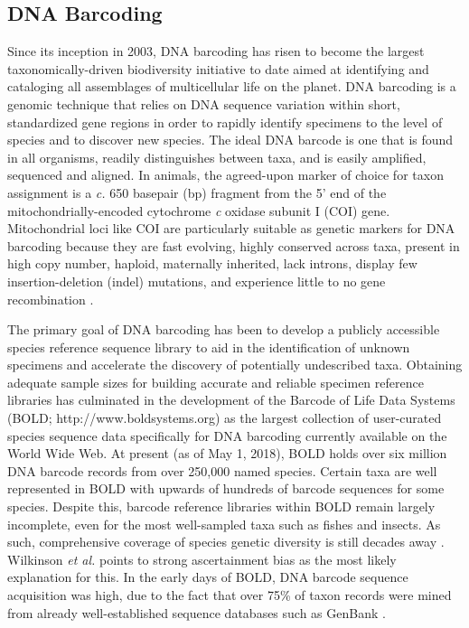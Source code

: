 \subsection{DNA Barcoding}

Since its inception in 2003, DNA barcoding \cite{hebert2003biological} has risen to become the largest \\ taxonomically-driven biodiversity initiative to date aimed at identifying and cataloging all assemblages of multicellular life on the planet. DNA barcoding is a genomic technique that relies on DNA sequence variation within short, standardized gene regions in order to rapidly identify specimens to the level of species and to discover new species. The ideal DNA barcode is one that is found in all organisms, readily distinguishes between taxa, and is easily amplified, sequenced and aligned. In animals, the agreed-upon marker of choice for taxon assignment is a \textit{c.} 650 basepair (bp) fragment from the 5' end of the mitochondrially-encoded cytochrome \textit{c} oxidase subunit I (COI) gene. Mitochondrial loci like COI are particularly suitable as genetic markers for DNA barcoding because they are fast evolving, highly conserved across taxa, present in high copy number, haploid, maternally inherited, lack introns, display few insertion-deletion (indel) mutations, and experience little to no gene recombination \cite{hebert2003biological, hebert2003barcoding}.



The primary goal of DNA barcoding has been to develop a publicly accessible species reference sequence library to aid in the identification of unknown specimens and accelerate the discovery of potentially undescribed taxa. Obtaining adequate sample sizes for building accurate and reliable specimen reference libraries has culminated in the development of the Barcode of Life Data Systems (BOLD; http://www.boldsystems.org) \cite{ratnasingham2007bold} as the largest collection of user-curated species sequence data specifically for DNA barcoding currently available on the World Wide Web. At present (as of May 1, 2018), BOLD holds over six million DNA barcode records from over 250,000 named species. Certain taxa are well represented in BOLD with upwards of hundreds of barcode sequences for some species. Despite this, barcode reference libraries within BOLD remain largely incomplete, even for the most well-sampled taxa such as fishes and insects. As such, comprehensive coverage of species genetic diversity is still decades away \cite{wilkinson2017replacing}. Wilkinson \textit{et al.} \cite{wilkinson2017replacing} points to strong ascertainment bias as the most likely explanation for this. In the early days of BOLD, DNA barcode sequence acquisition was high, due to the fact that over 75\% of taxon records were mined from already well-established sequence databases such as GenBank \cite{wilkinson2017replacing}.




